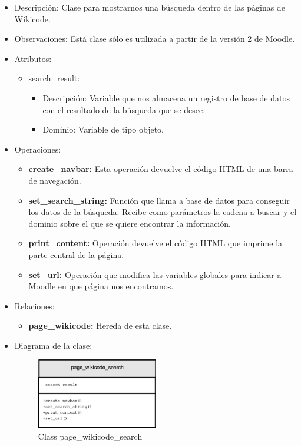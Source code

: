 \begin{itemize}
	\item Descripción: Clase para mostrarnos una búsqueda dentro de las páginas de Wikicode.
	\item Observaciones: Está clase sólo es utilizada a partir de la versión 2 de Moodle.
	\item Atributos:
		\begin{itemize}
			\item search\_result:
				\begin{itemize}
					\item Descripción: Variable que nos almacena un registro de base de datos con el resultado de la búsqueda que se desee.
					\item Dominio: Variable de tipo objeto.
				\end{itemize}
		\end{itemize}
	\item Operaciones:
		\begin{itemize}
			\item \textbf{create\_navbar: }Esta operación devuelve el código HTML de una barra de navegación.
			\item \textbf{set\_search\_string:} Función que llama a base de datos para conseguir los datos de la búsqueda. Recibe como parámetros la cadena a buscar y el dominio sobre el que se quiere encontrar la información.
			\item \textbf{print\_content: }Operación devuelve el código HTML que imprime la parte central de la página.
			\item \textbf{set\_url: }Operación que modifica las variables globales para indicar a Moodle en que página nos encontramos.
		\end{itemize}
	\item Relaciones:
		\begin{itemize}
			\item \textbf{page\_wikicode:} Hereda de esta clase.
		\end{itemize}
	\item Diagrama de la clase:
		\begin{figure}[h]
			\centering
			\includegraphics[width=0.5\textwidth]{./img/page_wikicode_search.eps}
			\caption{Class page\_wikicode\_search}
		\end{figure}
\end{itemize}

